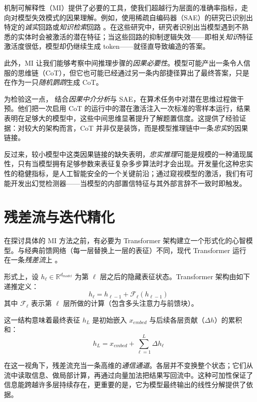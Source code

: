 机制可解释性（MI）提供了必要的工具，使我们超越行为层面的准确率指标，走向对模型失效模式的因果理解。例如，使用稀疏自编码器（SAE）的研究已识别出特定的\emph{诚实}回路或\emph{知识检索}回路 \citep{lindsey2025biology}。在这些研究中，研究者识别出当模型遇到不熟悉的实体时会被激活的潜在特征；当这些回路的抑制逻辑失效——即相关\emph{知识}特征激活度很低，模型却仍继续生成 token——就径直导致编造的答案。

此外，MI 让我们能够考察中间推理步骤的\emph{因果必要性}。模型可能产出一条令人信服的思维链（CoT），但它也可能已经通过另一条内部捷径算出了最终答案，只是在作为一只\emph{随机鹦鹉}生成 CoT。

为检验这一点，\citet{chen2025does} 结合\emph{因果中介分析}与 SAE，在算术任务中对潜在思维过程做干预。他们把一次启用 CoT 的运行中的潜在激活注入一次标准的零样本运行，结果表明在足够大的模型中，这些中间思维显著提升了解题置信度。这提供了经验证据：对较大的架构而言，CoT 并非仅是装饰，而是模型推理链中一条\emph{忠实}的因果链接。

反过来，较小模型中这类因果链接的缺失表明，\emph{忠实推理}可能是规模的一种涌现属性，只有当模型拥有足够参数来表征复杂多步算法时才会出现。开发量化这种忠实性的稳健指标，是人工智能安全的一个关键前沿；通过窥视模型的激活，我们有可能开发出幻觉检测器——当模型的内部置信特征与其外部言辞不一致时即触发。
\section{残差流与迭代精化} \label{residualstream}

在探讨具体的 MI 方法之前，有必要为 Transformer 架构建立一个形式化的心智模型。与经典前馈网络（每一层替换上一层的表征）不同，现代 Transformer 运行在一条\textit{残差流}上 \citep{elhage2021mathematical}。

形式上，设 $h_\ell \in \mathbb{R}^{d_{model}}$ 为第 $\ell$ 层之后的隐藏表征状态。Transformer 架构由如下递推定义：
\begin{equation}
    h_\ell = h_{\ell-1} + \mathcal{F}_\ell(h_{\ell-1})
\end{equation}
其中 $\mathcal{F}_\ell$ 表示第 $\ell$ 层所做的计算（包含多头注意力与前馈块）。


这一结构意味着最终表征 $h_L$ 是初始嵌入 $x_{embed}$ 与后续各层贡献（$\Delta h$）的累积和：
\begin{equation}
    h_L = x_{embed} + \sum_{\ell=1}^{L} \Delta h_\ell
\end{equation}

在这一视角下，残差流充当一条高维的\emph{通信通道}。各层并不变换整个状态；它们从流中读取信息、做局部计算，再通过向量加法把结果写回流中。这种可加性保证了信息能跨越许多层持续存在，更重要的是，它为模型最终输出的线性分解提供了依据。


